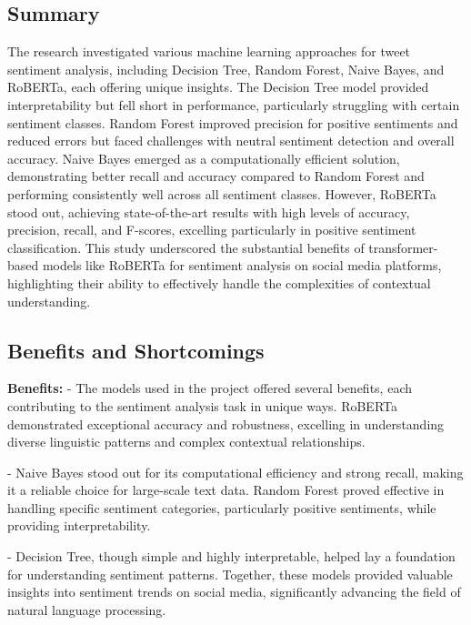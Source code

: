 \documentclass[journal]{IEEEtran}
\begin{document}
\subsection{\textbf{Summary}}
The research investigated various machine learning approaches for tweet sentiment analysis, including Decision Tree, Random Forest, Naive Bayes, and RoBERTa, each offering unique insights. The Decision Tree model provided interpretability but fell short in performance, particularly struggling with certain sentiment classes. Random Forest improved precision for positive sentiments and reduced errors but faced challenges with neutral sentiment detection and overall accuracy. Naive Bayes emerged as a computationally efficient solution, demonstrating better recall and accuracy compared to Random Forest and performing consistently well across all sentiment classes. However, RoBERTa stood out, achieving state-of-the-art results with high levels of accuracy, precision, recall, and F-scores, excelling particularly in positive sentiment classification. This study underscored the substantial benefits of transformer-based models like RoBERTa for sentiment analysis on social media platforms, highlighting their ability to effectively handle the complexities of contextual understanding.

\subsection{\textbf{Benefits and Shortcomings}}
\textbf{Benefits:}
\noindent - The models used in the project offered several benefits, each contributing to the sentiment analysis task in unique ways. RoBERTa demonstrated exceptional accuracy and robustness, excelling in understanding diverse linguistic patterns and complex contextual relationships.

\noindent - Naive Bayes stood out for its computational efficiency and strong recall, making it a reliable choice for large-scale text data. Random Forest proved effective in handling specific sentiment categories, particularly positive sentiments, while providing interpretability.

\noindent - Decision Tree, though simple and highly interpretable, helped lay a foundation for understanding sentiment patterns. Together, these models provided valuable insights into sentiment trends on social media, significantly advancing the field of natural language processing.
\end{document}
